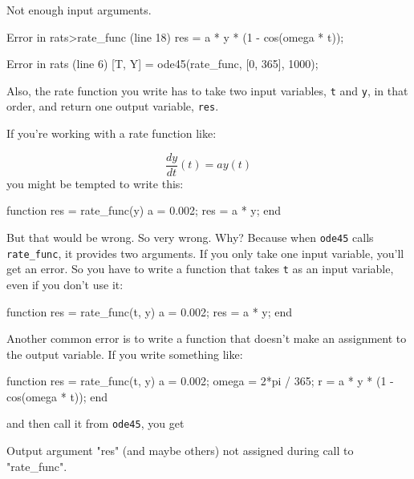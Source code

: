 
\begin{code}
Not enough input arguments.

Error in rats>rate_func (line 18)
    res = a * y * (1 - cos(omega * t));

Error in rats (line 6)
    [T, Y] = ode45(rate_func, [0, 365], 1000);
\end{code}

Also, the rate function you write has to take two input variables, 
\lstinline{t} and \lstinline{y}, in that order, and return one output variable, 
\lstinline{res}.


If you're working with a rate function like:

\begin{equation*}
\frac{dy}{dt}(t) = a y(t)
\end{equation*}
you might be tempted to write this:

\begin{code}
function res = rate_func(y)        %
    a = 0.002;
    res = a * y;
end
\end{code}

But that would be wrong.  So very wrong.  Why?  Because
when \lstinline{ode45} calls \lstinline{rate_func}, it provides two arguments.
If you only take one input variable, you'll get an error.  So
you have to write a function that takes \lstinline{t} as an input
variable, even if you don't use it:


\begin{code}
function res = rate_func(t, y)     %
    a = 0.002;
    res = a * y;
end
\end{code}

Another common error is to write a function that doesn't make
an assignment to the output variable.  If you write something
like:

\begin{code}
function res = rate_func(t, y)
    a = 0.002;
    omega = 2*pi / 365;
    r = a * y * (1 - cos(omega * t));    %
end
\end{code}
 and then call it from \lstinline{ode45}, you get

\begin{code}
Output argument "res" (and maybe others) not assigned during call
to "rate_func".
\end{code}

